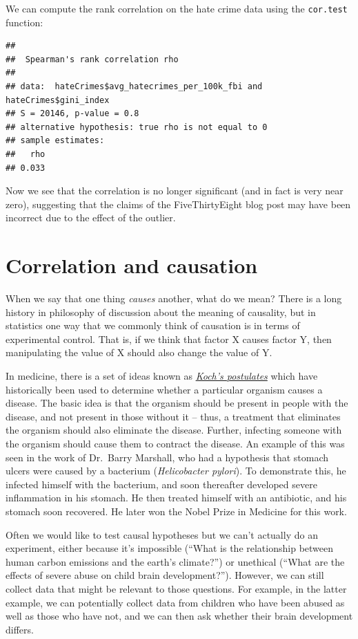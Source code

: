 \documentclass[12pt,]{book}
\theoremstyle{definition}
\theoremstyle{definition}
\theoremstyle{definition}
\theoremstyle{remark}
\begin{document}
We can compute the rank correlation on the hate crime data using the \texttt{cor.test} function:

\begin{verbatim}
## 
##  Spearman's rank correlation rho
## 
## data:  hateCrimes$avg_hatecrimes_per_100k_fbi and hateCrimes$gini_index
## S = 20146, p-value = 0.8
## alternative hypothesis: true rho is not equal to 0
## sample estimates:
##   rho 
## 0.033
\end{verbatim}

Now we see that the correlation is no longer significant (and in fact is very near zero), suggesting that the claims of the FiveThirtyEight blog post may have been incorrect due to the effect of the outlier.

\hypertarget{correlation-and-causation}{%
\section{Correlation and causation}\label{correlation-and-causation}}

When we say that one thing \emph{causes} another, what do we mean? There is a long history in philosophy of discussion about the meaning of causality, but in statistics one way that we commonly think of causation is in terms of experimental control. That is, if we think that factor X causes factor Y, then manipulating the value of X should also change the value of Y.

In medicine, there is a set of ideas known as \href{https://en.wikipedia.org/wiki/Koch\%27s_postulates}{\emph{Koch's postulates}} which have historically been used to determine whether a particular organism causes a disease. The basic idea is that the organism should be present in people with the disease, and not present in those without it -- thus, a treatment that eliminates the organism should also eliminate the disease. Further, infecting someone with the organism should cause them to contract the disease. An example of this was seen in the work of Dr.~Barry Marshall, who had a hypothesis that stomach ulcers were caused by a bacterium (\emph{Helicobacter pylori}). To demonstrate this, he infected himself with the bacterium, and soon thereafter developed severe inflammation in his stomach. He then treated himself with an antibiotic, and his stomach soon recovered. He later won the Nobel Prize in Medicine for this work.

Often we would like to test causal hypotheses but we can't actually do an experiment, either because it's impossible (``What is the relationship between human carbon emissions and the earth's climate?'') or unethical (``What are the effects of severe abuse on child brain development?''). However, we can still collect data that might be relevant to those questions. For example, in the latter example, we can potentially collect data from children who have been abused as well as those who have not, and we can then ask whether their brain development differs.
\end{document}
